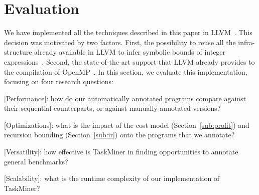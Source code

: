 \documentclass[sigplan,10pt,review,anonymous]{acmart}
\newcommand\Taskminer{\mbox{\textsf{TaskMiner}}}
\begin{document}
\section{Evaluation}
\label{sec:eval}



We have implemented all the techniques described in this paper in
LLVM~\cite{Lattner04}.
This decision was motivated by two factors.
First, the possibility to reuse all the infra-structure already
available in LLVM to infer symbolic bounds of integer
expressions~\cite{Mendonca17}.
Second, the state-of-the-art support that LLVM already provides to the
compilation of OpenMP~\cite{Antao16,Bertolli14,Martineau16}.
In this section, we evaluate this implementation, focusing on four research
questions:
%
\begin{compactitem}
\item \textsf{[Performance]}: how do our automatically annotated programs
compare against their sequential counterparts, or against manually annotated
versions?
\item \textsf{[Optimizations]}: what is the impact of the cost model
(Section~\ref{sub:profit}) and recursion bounding (Section~\ref{sub:ir}) onto
the programs that we annotate?
\item \textsf{[Versatility]}: how effective is \Taskminer{} in finding
opportunities to annotate general benchmarks?
\item \textsf{[Scalability]}: what is the runtime complexity of our
implementation of \Taskminer?
\end{compactitem}
\end{document}
